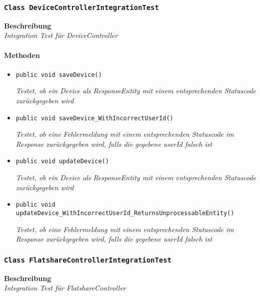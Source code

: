  \subsubsection{\texttt{Class DeviceControllerIntegrationTest}}
 \textbf{Beschreibung} \\
 \textit{Integration Test für DeviceController}
 \paragraph*{Methoden}
 \begin{itemize}
 	\item{\texttt{public void saveDevice()}}
 	
 	\textit{Testet, ob ein Device als ResponseEntity mit einem entsprechenden Statuscode zurückgegeben wird}
 	
 	\item{\texttt{public void saveDevice\_WithIncorrectUserId()}}
 	
 	\textit{Testet, ob eine Fehlermeldung mit einem entsprechenden Statuscode im Response zurückgegeben wird, falls die gegebene userId falsch ist}
 	
 	\item{\texttt{public void updateDevice()}}
 	
 	\textit{Testet, ob ein Device als ResponseEntity mit einem entsprechenden Statuscode zurückgegeben wird}
 	
 	\item{\texttt{public void updateDevice\_WithIncorrectUserId\_Returns\-UnprocessableEntity()}}
 	
 	\textit{Testet, ob eine Fehlermeldung mit einem entsprechenden Statuscode im Response zurückgegeben wird, falls die gegebene userId falsch ist}
 \end{itemize}
 
 \subsubsection{\texttt{Class FlatshareControllerIntegrationTest}}
 \textbf{Beschreibung} \\
 \textit{Integration Test für FlatshareController}

